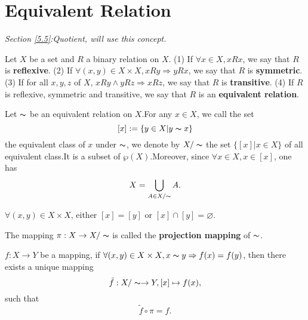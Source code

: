 \section{Equivalent Relation}\label{4.2}
\textit{Section \ref{5.5}:Quotient,  will use this concept.}
\begin{definitionenv}
    Let $X$ be a set and $R$ a binary relation on $X$.
    \newline
    (1) If $\forall x \in X , xRx$,  we say that $R$ is \textbf{reflexive}.
    \newline
    (2) If $\forall (x, y) \in X\times X, xRy\Rightarrow yRx$, we say that $R$ is \textbf{symmetric}.
    \newline
    (3) If for all $x, y, z$ of $X$,  $xRy\wedge yRz\Rightarrow xRz$, we say that $R$ is \textbf{transitive}.
    \newline
    (4) If $R$ is reflexive, symmetric and transitive,  we say that $R$ is an \textbf{equivalent relation}.

\end{definitionenv}
\begin{definitionenv}
    Let $\thicksim$ be an equivalent relation on $X$.For any $x\in X$,  we call the set $$[x]:=\{y\in X|y\thicksim x\}$$ the equivalent class of $x$ under $\thicksim$, we denote by $X/\thicksim$ the set $\{[x]|x\in X\}$ of all equivalent class.It is a subset of $\wp (X)$.Moreover,  since $\forall x\in X, x\in [x] $,  one has $$X=\bigcup_{A\in X/\thicksim}A.$$
\end{definitionenv}
\begin{propositionenv}
    $\forall (x, y)\in X\times X$,  either $[x]=[y]$ or $[x]\cap [y]=\varnothing$.
\end{propositionenv}
\begin{definitionenv}
    The mapping $\pi :X\rightarrow X/\thicksim$ is called the \textbf{projection mapping} of $\thicksim$.
\end{definitionenv}
\begin{propositionenv}\label{4.2.5}
    $f:X\rightarrow Y$ be a mapping, if $\forall (x, y)\in X\times X, x\thicksim y\Rightarrow f(x)=f(y)$, then there exists a unique mapping$$\tilde{f}:X/\thicksim\rightarrow Y,  [x]\mapsto f(x), $$ such that $$\tilde{f}\circ \pi =f.$$


\begin{center}
\end{center}
\end{propositionenv}

